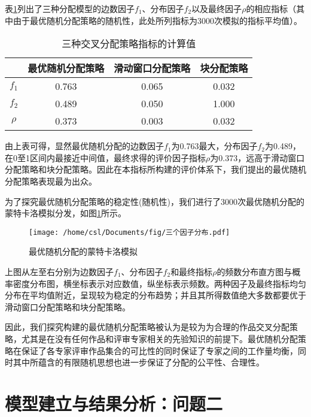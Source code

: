 \documentclass[bwprint]{gmcmthesis}
\begin{document}
表\ref{tab:三种交叉分配策略指标的计算值}列出了三种分配模型的边数因子$f_1$、分布因子$f_2$以及最终因子$\rho$的相应指标（其中由于最优随机分配策略的随机性，此处所列指标为3000次模拟的指标平均值）。
\begin{table}[h]
	\centering
	\caption{三种交叉分配策略指标的计算值}
	\begin{tabular}{cccc}
		\midrule[1pt]
		& 最优随机分配策略 & 滑动窗口分配策略 & 块分配策略 \\ \midrule[1pt]\midrule[1pt]
		$f_1$ & 0.763    & 0.065    & 0.032 \\
		$f_2$ & 0.489    & 0.050    & 1.000    \\
		$\rho$  & 0.373      & 0.003    & 0.032 \\ \midrule[1pt]
	\end{tabular}
	\label{tab:三种交叉分配策略指标的计算值}
\end{table}
由上表可得，显然最优随机分配的边数因子$f_1$为0.763最大，分布因子$f_2$为0.489，在0至1区间内最接近中间值，最终求得的评价因子指标$\rho$为0.373，远高于滑动窗口分配策略和块分配策略。因此在本指标所构建的评价体系下，我们提出的最优随机分配策略表现最为出众。

为了探究最优随机分配策略的稳定性(随机性)，我们进行了3000次最优随机分配的蒙特卡洛模拟分发，如图\ref{fig:最优随机分配的蒙特卡洛模拟}所示。
	\begin{figure}[h]
	\centering
	\texttt{[image: /home/csl/Documents/fig/三个因子分布.pdf]}
	\caption{\normf 最优随机分配的蒙特卡洛模拟}
	\label{fig:最优随机分配的蒙特卡洛模拟}
\end{figure}
上图从左至右分别为边数因子$f_1$、分布因子$f_2$和最终指标$\rho$的频数分布直方图与概率密度分布图\cite{barfoot2017state}，横坐标表示对应数值，纵坐标表示频数。两种因子及最终指标均匀分布在平均值附近，呈现较为稳定的分布趋势；并且其所得数值绝大多数都要优于滑动窗口分配策略和块分配策略。

因此，我们探究构建的最优随机分配策略被认为是较为为合理的作品交叉分配策略，尤其是在没有任何作品和评审专家相关的先验知识的前提下。最优随机分配策略在保证了各专家评审作品集合的可比性的同时保证了专家之间的工作量均衡，同时其中所蕴含的有限随机思想也进一步保证了分配的公平性、合理性。

\newpage

\section{模型建立与结果分析：问题二 }

\subsection{}
\end{document}

